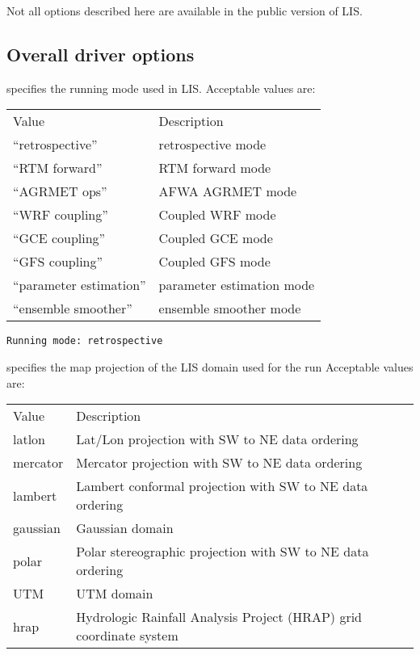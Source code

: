  
 Not all options described here are available in the public 
 version of LIS.
 
 

 
 \subsection{Overall driver options} \label{ssec:driveropts}
 

 
  specifies the running mode used in LIS.
 Acceptable values are:
 \begin{tabular}{ll}
 Value                    & Description                \\
 ``retrospective''        & retrospective mode         \\
 
 ``RTM forward''          & RTM forward mode           \\
 ``AGRMET ops''           & AFWA AGRMET mode           \\
 
 ``WRF coupling''         & Coupled WRF mode           \\
 
 ``GCE coupling''         & Coupled GCE mode           \\
 ``GFS coupling''         & Coupled GFS mode           \\
 ``parameter estimation'' & parameter estimation mode  \\
 
 ``ensemble smoother''    & ensemble smoother mode     \\
 \end{tabular}
 

 \begin{Verbatim}[frame=single]
Running mode: retrospective
 \end{Verbatim}

 
 
  specifies the 
 map projection of the LIS domain used for the run
 Acceptable values are:

 \begin{tabular}{ll}
 Value    & Description                                              \\
 latlon   & Lat/Lon projection with SW to NE data ordering           \\
 mercator & Mercator projection with SW to NE data ordering          \\
 lambert  & Lambert conformal projection with SW to NE data ordering \\
 gaussian & Gaussian domain                                          \\
 polar    & Polar stereographic projection with SW to NE data ordering \\
 UTM      & UTM domain                                               \\
 hrap     & Hydrologic Rainfall Analysis Project (HRAP) grid
            coordinate system \\
 \end{tabular}
 

